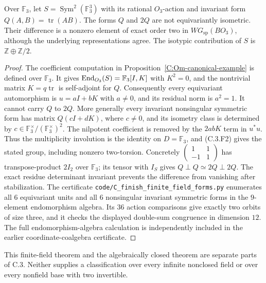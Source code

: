 \begin{proposition}
\label{C:Om-finite-field-form-example}
Over $\mathbb F_3$, let $S=\operatorname{Sym}^2(\mathbb F_3^3)$ with
its rational $O_3$-action and invariant form $Q(A,B)=\operatorname{tr}(AB)$.
The forms $Q$ and $2Q$ are not equivariantly isometric. Their difference
is a nonzero element of exact order two in $WG_{\mathrm{sp}}(BO_3)$,
although the underlying representations agree. The isotypic contribution
of $S$ is $\mathbb Z\oplus\mathbb Z/2$.
\end{proposition}
\begin{proof}
The coefficient computation in
Proposition~\ref{C:Om-canonical-example} is defined over $\mathbb F_3$.
It gives $\operatorname{End}_{O_3}(S)=\mathbb F_3[I,K]$ with $K^2=0$, and the
nontrivial matrix $K=q\operatorname{tr}$ is self-adjoint for $Q$.
Consequently every equivariant automorphism is $u=aI+bK$ with $a\ne0$,
and its residual norm is $a^2=1$. It cannot carry $Q$ to $2Q$.
More generally every invariant nonsingular symmetric form has matrix
$Q(cI+dK)$, where $c\ne0$, and its isometry class is determined by
$c\in\mathbb F_3^\times/(\mathbb F_3^\times)^2$. The nilpotent
coefficient is removed by the $2abK$ term in $u^*u$.
Thus the multiplicity involution is the identity on $D=\mathbb F_3$,
and (C.3.F2) gives the stated group, including nonzero two-torsion.
Concretely $\left(\begin{smallmatrix}1&1\\-1&1\end{smallmatrix}\right)$
has transpose-product $2I_2$ over $\mathbb F_3$; its tensor with $I_S$
gives $Q\perp Q\simeq2Q\perp2Q$. The exact residue determinant
invariant prevents the difference from vanishing after stabilization.
The certificate \texttt{code/C\_finish\_finite\_field\_forms.py}
enumerates all $6$ equivariant units and all $6$ nonsingular invariant
symmetric forms in the $9$-element endomorphism algebra. Its $36$
action comparisons give exactly two orbits of size three, and it
checks the displayed double-sum congruence in dimension $12$.
The full endomorphism-algebra calculation is independently included
in the earlier coordinate-coalgebra certificate.
\end{proof}

This finite-field theorem and the algebraically closed theorem are
separate parts of C.3. Neither supplies a classification over every
infinite nonclosed field or over every nonfield base with two invertible.
